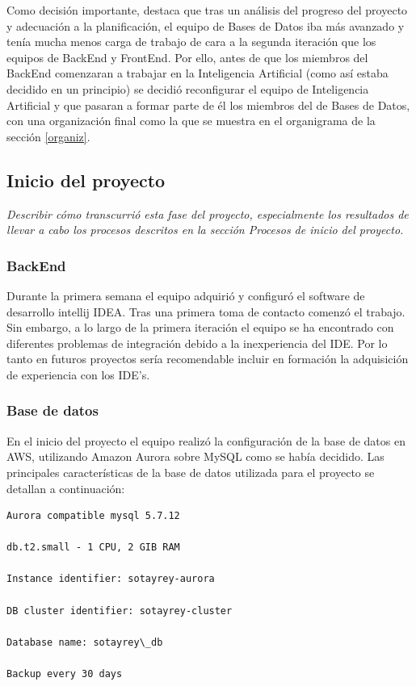 Como decisión importante, destaca que tras un análisis del progreso del proyecto y adecuación a la planificación, el equipo de Bases de Datos iba más avanzado y tenía mucha menos carga de trabajo de cara a la segunda iteración que los equipos de BackEnd y FrontEnd. Por ello, antes de que los miembros del BackEnd comenzaran a trabajar en la Inteligencia Artificial (como así estaba decidido en un principio) se decidió reconfigurar el equipo de Inteligencia Artificial y que pasaran a formar parte de él los miembros del de Bases de Datos, con una organización final como la que se muestra en el organigrama de la sección \ref{organiz}.

\subsection{Inicio del proyecto}
\label{Inicio del proyecto}
\emph{Describir cómo transcurrió esta fase del proyecto, especialmente los resultados de llevar a cabo los procesos descritos en la sección Procesos de inicio del proyecto.}
\subsubsection*{BackEnd}
Durante la primera semana el equipo adquirió y configuró el software de desarrollo intellij IDEA. Tras una primera toma de contacto comenzó el trabajo. Sin embargo, a lo largo de la primera iteración el equipo se ha encontrado con diferentes problemas de integración debido a la inexperiencia del IDE. Por lo tanto en futuros proyectos sería recomendable incluir en formación la adquisición de experiencia con los IDE's.
\subsubsection*{Base de datos}
En el inicio del proyecto el equipo realizó la configuración de la base de datos en AWS, utilizando Amazon Aurora sobre MySQL como se había decidido. Las principales características de la base de datos utilizada para el proyecto se detallan a continuación:

\begin{lstlisting}
Aurora compatible mysql 5.7.12

db.t2.small - 1 CPU, 2 GIB RAM

Instance identifier: sotayrey-aurora

DB cluster identifier: sotayrey-cluster

Database name: sotayrey\_db

Backup every 30 days
\end{lstlisting}

